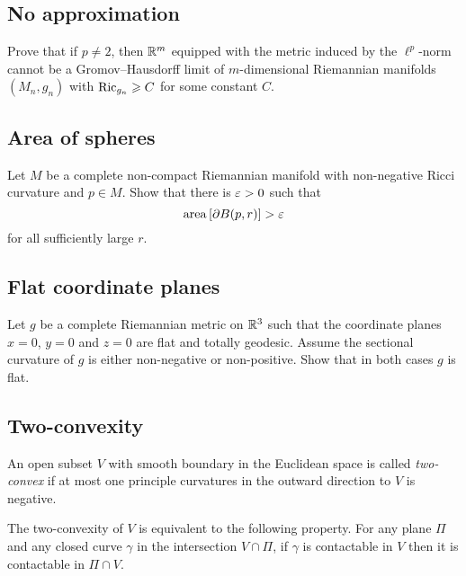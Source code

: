 \subsection*{No approximation\many}
\label{No approximation}

\begin{pr}
Prove that 
if $p\not=2$,
then $\mathbb{R}^m$ 
equipped with the metric induced by the $\ell^p$-norm 
cannot be a
Gromov--Hausdorff limit of
$m$-dimensional Riemannian manifolds $(M_n,g_n)$ with $\Ric_{g_n}\z\ge C$ for some constant $C$.
\end{pr}

\subsection*{Area of spheres}
\label{Area of spheres}

\begin{pr}
Let $M$ be a complete non-compact Riemannian manifold 
with non-negative Ricci curvature and $p\in M$.
Show that there is $\varepsilon>0$ such that 
$$\operatorname{\rm area}\nolimits\left[\partial B(p,r)\right]>\varepsilon$$
for all sufficiently large $r$.
\end{pr}

\subsection*{Flat coordinate planes}
\label{Flat coordinate planes}

\begin{pr}
Let $g$ be a complete Riemannian metric on $\mathbb{R}^3$ such that the coordinate planes $x=0$, $y=0$ and $z=0$ are flat and totally geodesic.
Assume the sectional curvature of $g$ is either non-negative or non-positive.
Show that in both cases $g$ is flat. 
\end{pr}

\subsection*{Two-convexity\many}
\label{Two-convexity}

An open subset $V$ with smooth boundary in the Euclidean space  
is called \emph{two-convex} if at most one principle curvatures in the outward direction to $V$ is negative.

The two-convexity of $V$ is equivalent to the following property.
For any plane $\Pi$ and any closed curve $\gamma$ in the intersection  $V\cap \Pi$,
if $\gamma$ is contactable in $V$ then it is contactable in $\Pi\cap V$.

